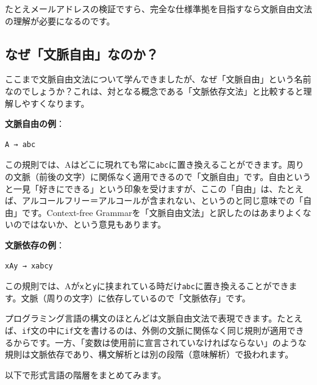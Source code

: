 たとえメールアドレスの検証ですら、完全な仕様準拠を目指すなら文脈自由文法の理解が必要になるのです。

\hypertarget{chapter4-ux306aux305cux6587ux8108ux81eaux7531ux306aux306eux304b}{%
\subsection{なぜ「文脈自由」なのか？}\label{chapter4-ux306aux305cux6587ux8108ux81eaux7531ux306aux306eux304b}}

ここまで文脈自由文法について学んできましたが、なぜ「文脈自由」という名前なのでしょうか？これは、対となる概念である「文脈依存文法」と比較すると理解しやすくなります。

\textbf{文脈自由の例}：

\begin{verbatim}
A → abc
\end{verbatim}

この規則では、Aはどこに現れても常に\texttt{abc}に置き換えることができます。周りの文脈（前後の文字）に関係なく適用できるので「文脈自由」です。自由というと一見「好きにできる」という印象を受けますが、ここの「自由」は、たとえば、アルコールフリー＝アルコールが含まれない、というのと同じ意味での「自由」です。Context-free
Grammarを「文脈自由文法」と訳したのはあまりよくないのではないか、という意見もあります。

\textbf{文脈依存の例}：

\begin{verbatim}
xAy → xabcy
\end{verbatim}

この規則では、Aが\texttt{x}と\texttt{y}に挟まれている時だけ\texttt{abc}に置き換えることができます。文脈（周りの文字）に依存しているので「文脈依存」です。

プログラミング言語の構文のほとんどは文脈自由文法で表現できます。たとえば、\texttt{if}文の中に\texttt{if}文を書けるのは、外側の文脈に関係なく同じ規則が適用できるからです。一方、「変数は使用前に宣言されていなければならない」のような規則は文脈依存であり、構文解析とは別の段階（意味解析）で扱われます。

以下で形式言語の階層をまとめてみます。

